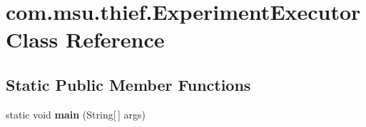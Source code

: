 \hypertarget{classcom_1_1msu_1_1thief_1_1ExperimentExecutor}{\section{com.\-msu.\-thief.\-Experiment\-Executor Class Reference}
\label{classcom_1_1msu_1_1thief_1_1ExperimentExecutor}
}
\subsection*{Static Public Member Functions}
\begin{DoxyCompactItemize}
\item 
\hypertarget{classcom_1_1msu_1_1thief_1_1ExperimentExecutor_ad642dd9f5e08bceed0e8f2d08bc11729}{static void {\bfseries main} (String\mbox{[}$\,$\mbox{]} args)}\label{classcom_1_1msu_1_1thief_1_1ExperimentExecutor_ad642dd9f5e08bceed0e8f2d08bc11729}

\end{DoxyCompactItemize}
